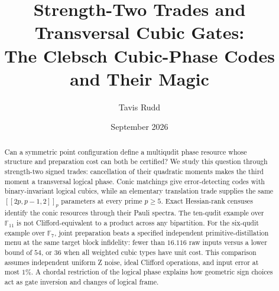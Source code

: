 \documentclass[11pt]{article}
\title{Strength-Two Trades and Transversal Cubic Gates:\\The Clebsch Cubic-Phase Codes and Their Magic}
\author{Tavis Rudd}
\date{September 2026}
\begin{document}
\maketitle
\begin{abstract}
Can a symmetric point configuration define a multiqudit phase resource whose
structure and preparation cost can both be certified? We study this question
through strength-two signed trades: cancellation of their quadratic moments
makes the third moment a transversal logical phase. Conic matchings give
error-detecting codes with binary-invariant logical cubics, while an elementary
translation trade supplies the same $[[2p,p-1,2]]_p$ parameters at every prime
$p\geq5$. Exact Hessian-rank censuses identify the conic resources through their
Pauli spectra. The ten-qudit example over $\mathbb F_{11}$ is not
Clifford-equivalent to a product across any bipartition. For the six-qudit
example over $\mathbb F_7$, joint preparation beats a specified independent
primitive-distillation menu at the same target block infidelity: fewer than
$16.116$ raw inputs versus a lower bound of $54$, or $36$ when all weighted
cubic types have unit cost. This comparison assumes independent uniform Z noise,
ideal Clifford operations, and input error at most $1\%$.
A chordal restriction of the logical phase explains how geometric sign choices
act as gate inversion and changes of logical frame.
\end{abstract}




\appendix


\end{document}
